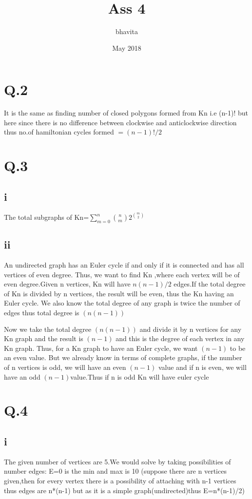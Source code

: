 \documentclass{article}
\title{Ass 4}
\author{bhavita }
\date{May 2018}
\begin{document}
\maketitle
\section{Q.2}
It is the same as finding number of closed polygons formed from Kn i.e (n-1)! but here since there is no difference between clockwise and anticlockwise direction thus no.of hamiltonian cycles formed $=(n-1)!/2$ 

\section{Q.3}
\subsection{i}
The total subgraphs of Kn=$\sum_{m=0}^{n}{n\choose  m}2^{m\choose  2}  $
\subsection{ii}
An undirected graph has an Euler cycle if and only if it is connected
and has all vertices of even degree. Thus, we want to find Kn ,where each vertex will be of even degree.Given n vertices, Kn will have $n(n -1)/2 $ edges.If the total degree of Kn is divided by n vertices, the result will be even, thus the Kn having an Euler cycle. We also know the total degree of any graph is twice the number of edges thus total degree is $(n(n-1))$

Now we take the total degree $(n(n -1))$ and divide it by n vertices for any Kn
graph and the result is $(n -1)$ and this  is the degree of each vertex in any Kn graph.
Thus, for a Kn graph to have an Euler cycle, we want $(n - 1)$ to be an even value. But we already know in terms of complete graphs, if the number of n vertices is odd, we will have an even $(n -1)$ value and if n is even, we will have an odd $(n -1)$value.Thus if n is odd Kn will have euler cycle 

\section{Q.4}
\subsection{i}
The given number of vertices are 5.We would solve by taking possibilities of number edges:
E=0 is the min and max is 10 (suppose there are n vertices given,then for every vertex there is a possibility of attaching with n-1 vertices thus edges are n*(n-1) but as it is a simple graph(undirected)thus E=n*(n-1)/2)
\end{document}
